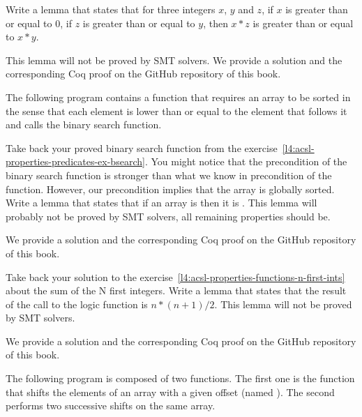 





Write a lemma that states that for three integers $x$, $y$ and $z$, if $x$ is
greater than or equal to $0$, if $z$ is greater than or equal to $y$, then
$x * z$ is greater than or equal to $x * y$.


This lemma will not be proved by SMT solvers. We provide a solution and the
corresponding Coq proof on the GitHub repository of this book.


\label{l4:acsl-properties-lemmas-lsorted-gsorted}


The following program contains a function that requires an array to be sorted
in the sense that each element is lower than or equal to the element that
follows it and calls the binary search function.




Take back your proved binary search function from the
exercise~\ref{l4:acsl-properties-predicates-ex-bsearch}. You might notice that
the precondition of the binary search function is stronger than what we know in
precondition of the  function. However, our precondition
implies that the array is globally sorted. Write a lemma that states that if
an array is  then it is .
This lemma will probably not be proved by SMT solvers, all remaining properties
should be.

We provide a solution and the corresponding Coq proof on the GitHub repository
of this book.


\label{l4:acsl-properties-lemmas-n-first-ints}

Take back your solution to the
exercise~\ref{l4:acsl-properties-functions-n-first-ints} about the sum of the
N first integers. Write a lemma that states that the result of the call to the
logic function is $n*(n+1)/2$. This lemma will not be proved by SMT solvers.


We provide a solution and the corresponding Coq proof on the GitHub repository
of this book.


\label{l4:acsl-properties-lemmas-shift-trans}


The following program is composed of two functions. The first one is the
 function that shifts the elements of an array with a
given offset (named ). The second performs two successive
shifts on the same array.


